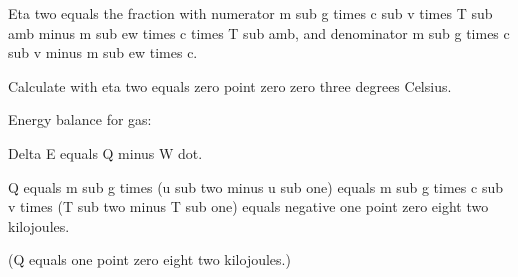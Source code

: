 Eta two equals the fraction with numerator m sub g times c sub v times T sub amb minus m sub ew times c times T sub amb, and denominator m sub g times c sub v minus m sub ew times c.

Calculate with eta two equals zero point zero zero three degrees Celsius.

Energy balance for gas:

Delta E equals Q minus W dot.

Q equals m sub g times (u sub two minus u sub one) equals m sub g times c sub v times (T sub two minus T sub one) equals negative one point zero eight two kilojoules.

(Q equals one point zero eight two kilojoules.)
